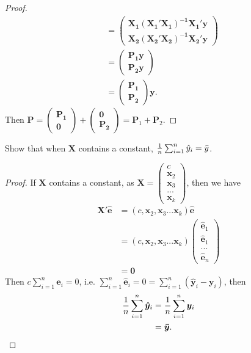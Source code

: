 \documentclass[12pt]{article}
\newenvironment{question}[2][Question]{\begin{trivlist}
\item[\hskip \labelsep {\bfseries #1}\hskip \labelsep {\bfseries #2.}]}{\end{trivlist}}
\begin{document}
\begin{proof}
\begin{align*}
&=\begin{pmatrix}\bm{X_1(X_1'X_1)^{-1}X_1'y}\\\bm{X_2(X_2'X_2)^{-1}X_2'y}\end{pmatrix}\\
&=\begin{pmatrix}\bm{P_1y}\\\bm{P_2y}\end{pmatrix}\\
&=\begin{pmatrix}\bm{P_1}\\\bm{P_2}\end{pmatrix}\bm{y}.
\end{align*}
Then $\bm{P} = \begin{pmatrix}\bm{P_1}\\\bm{0}\end{pmatrix}+
\begin{pmatrix}\bm{0}\\\bm{P_2}\end{pmatrix} = \bm{P}_1+\bm{P}_2$.

\end{proof}

\begin{question}{3.11}
Show that when $\bm{X}$ contains a constant, $\frac{1}{n}\sum_{i = 1}^{n}\hat{y}_i = \Bar{y}$.
\end{question}

\begin{proof}
If $\bm{X}$ contains a constant, as $\bm{X} = \begin{pmatrix}c\\\bm{x}_2\\\bm{x}_3\\...\\\bm{x}_k\end{pmatrix}$, then we have
\begin{align*}
\bm{X'\hat{e}}&=(c,\bm{x}_2,\bm{x}_3...\bm{x}_k)\bm{\hat{e}}\\
&=(c,\bm{x}_2,\bm{x}_3...\bm{x}_k)
\begin{pmatrix}
\hat{\bm{e}}_1\\\hat{\bm{e}}_1\\...\\\hat{\bm{e}}_n
\end{pmatrix}\\
&=\bm{0}
\end{align*}
Then $c\sum_{i = 1}^{n}\bm{\hat{e}}_i = 0$, i.e. $\sum_{i = 1}^{n}\bm{\hat{e}}_i = 0 = \sum_{i = 1}^{n}(\bm{\hat{y}}_i-\bm{y}_i)$, then
\begin{align*}
\frac{1}{n}\sum_{i = 1}^{n}\bm{\hat{y}}_i &= \frac{1}{n}\sum_{i = 1}^{n}\bm{y}_i\\
&= \bm{\Bar{y}}.
\end{align*}

\end{proof}
\end{document}
